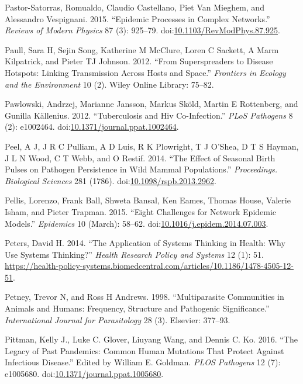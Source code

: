 \documentclass[]{book}
\theoremstyle{definition}
\theoremstyle{definition}
\theoremstyle{definition}
\theoremstyle{remark}
\begin{document}
\hypertarget{ref-pastor-satorras15}{}
Pastor-Satorras, Romualdo, Claudio Castellano, Piet Van Mieghem, and
Alessandro Vespignani. 2015. ``Epidemic Processes in Complex Networks.''
\emph{Reviews of Modern Physics} 87 (3): 925--79.
doi:\href{https://doi.org/10.1103/RevModPhys.87.925}{10.1103/RevModPhys.87.925}.

\hypertarget{ref-paull12}{}
Paull, Sara H, Sejin Song, Katherine M McClure, Loren C Sackett, A Marm
Kilpatrick, and Pieter TJ Johnson. 2012. ``From Superspreaders to
Disease Hotspots: Linking Transmission Across Hosts and Space.''
\emph{Frontiers in Ecology and the Environment} 10 (2). Wiley Online
Library: 75--82.

\hypertarget{ref-pawlowski12}{}
Pawlowski, Andrzej, Marianne Jansson, Markus Sköld, Martin E Rottenberg,
and Gunilla Källenius. 2012. ``Tuberculosis and Hiv Co-Infection.''
\emph{PLoS Pathogens} 8 (2): e1002464.
doi:\href{https://doi.org/10.1371/journal.ppat.1002464}{10.1371/journal.ppat.1002464}.

\hypertarget{ref-peel14}{}
Peel, A J, J R C Pulliam, A D Luis, R K Plowright, T J O'Shea, D T S
Hayman, J L N Wood, C T Webb, and O Restif. 2014. ``The Effect of
Seasonal Birth Pulses on Pathogen Persistence in Wild Mammal
Populations.'' \emph{Proceedings. Biological Sciences} 281 (1786).
doi:\href{https://doi.org/10.1098/rspb.2013.2962}{10.1098/rspb.2013.2962}.

\hypertarget{ref-pellis15}{}
Pellis, Lorenzo, Frank Ball, Shweta Bansal, Ken Eames, Thomas House,
Valerie Isham, and Pieter Trapman. 2015. ``Eight Challenges for Network
Epidemic Models.'' \emph{Epidemics} 10 (March): 58--62.
doi:\href{https://doi.org/10.1016/j.epidem.2014.07.003}{10.1016/j.epidem.2014.07.003}.

\hypertarget{ref-peters14}{}
Peters, David H. 2014. ``The Application of Systems Thinking in Health:
Why Use Systems Thinking?'' \emph{Health Research Policy and Systems} 12
(1): 51.
\url{https://health-policy-systems.biomedcentral.com/articles/10.1186/1478-4505-12-51}.

\hypertarget{ref-petney98}{}
Petney, Trevor N, and Ross H Andrews. 1998. ``Multiparasite Communities
in Animals and Humans: Frequency, Structure and Pathogenic
Significance.'' \emph{International Journal for Parasitology} 28 (3).
Elsevier: 377--93.

\hypertarget{ref-pittman16}{}
Pittman, Kelly J., Luke C. Glover, Liuyang Wang, and Dennis C. Ko. 2016.
``The Legacy of Past Pandemics: Common Human Mutations That Protect
Against Infectious Disease.'' Edited by William E. Goldman. \emph{PLOS
Pathogens} 12 (7): e1005680.
doi:\href{https://doi.org/10.1371/journal.ppat.1005680}{10.1371/journal.ppat.1005680}.
\end{document}

